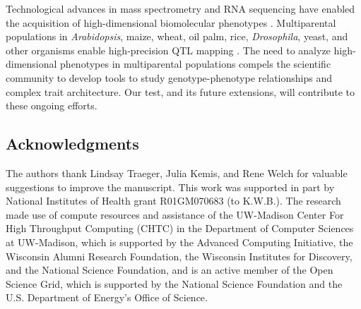 \documentclass[oneside]{book}
\begin{document}
Technological advances
in mass spectrometry and RNA sequencing have enabled the acquisition of
high-dimensional biomolecular phenotypes
\citep{ozsolak2011rna,han2012multi}. Multiparental populations in
\textit{Arabidopsis}, maize, wheat, oil palm, rice,
\textit{Drosophila}, yeast, and other organisms enable high-precision
QTL mapping \citep{yu2008genetic, tisne2017identification,
  stanley2017genetic, raghavan2017approaches, mackay2012drosophila,
  kover2009multiparent, cubillos2013high}. The need to analyze
high-dimensional phenotypes in multiparental populations compels the
scientific community to develop tools to study genotype-phenotype
relationships and complex trait architecture. Our test, and its future
extensions, will contribute to these ongoing efforts.




\subsection*{Acknowledgments}

The authors thank Lindsay Traeger, Julia Kemis, and Rene Welch for
valuable suggestions to improve the manuscript. This work was
supported in part by National Institutes of Health grant R01GM070683
(to K.W.B.). The research made use of compute resources and assistance
of the UW-Madison Center For High Throughput Computing (CHTC) in the
Department of Computer Sciences at UW-Madison, which is supported by
the Advanced Computing Initiative, the Wisconsin Alumni Research
Foundation, the Wisconsin Institutes for Discovery, and the National
Science Foundation, and is an active member of the Open Science Grid,
which is supported by the National Science Foundation and the U.S.
Department of Energy's Office of Science.





%




\end{document}
